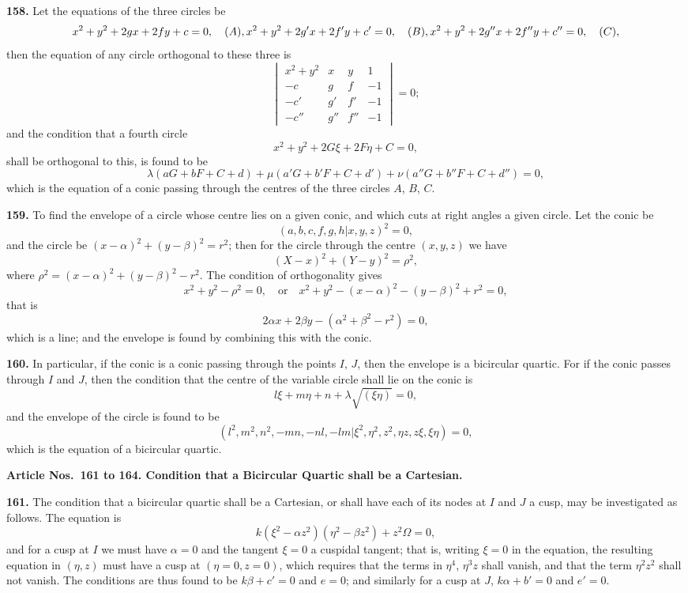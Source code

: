 \documentclass[12pt,a4paper]{article}
\theoremstyle{definition}
\begin{document}
\noindent\textbf{158.} Let the equations of the three circles be
\[
x^2 + y^2 + 2gx + 2fy + c = 0, \quad (A), \\
x^2 + y^2 + 2g'x + 2f'y + c' = 0, \quad (B), \\
x^2 + y^2 + 2g''x + 2f''y + c'' = 0, \quad (C),
\]
then the equation of any circle orthogonal to these three is
\[
\begin{vmatrix}
x^2 + y^2 & x & y & 1 \\
-c & g & f & -1 \\
-c' & g' & f' & -1 \\
-c'' & g'' & f'' & -1
\end{vmatrix}
= 0;
\]
and the condition that a fourth circle
\[
x^2 + y^2 + 2G\xi + 2F\eta + C = 0,
\]
shall be orthogonal to this, is found to be
\[
\lambda(aG + bF + C + d) + \mu(a'G + b'F + C + d') + \nu(a''G + b''F + C + d'') = 0,
\]
which is the equation of a conic passing through the centres of the three circles $A$, $B$, $C$.

\newpage
\noindent\textbf{159.} To find the envelope of a circle whose centre lies on a given conic, and
which cuts at right angles a given circle. Let the conic be
\[
(a, b, c, f, g, h \vert x, y, z)^2 = 0,
\]
and the circle be $(x - \alpha)^2 + (y - \beta)^2 = r^2$; then for the circle through the centre $(x, y, z)$
we have
\[
(X - x)^2 + (Y - y)^2 = \rho^2,
\]
where $\rho^2 = (x - \alpha)^2 + (y - \beta)^2 - r^2$. The condition of orthogonality gives
\[
x^2 + y^2 - \rho^2 = 0, \quad\text{or}\quad x^2 + y^2 - (x - \alpha)^2 - (y - \beta)^2 + r^2 = 0,
\]
that is
\[
2\alpha x + 2\beta y - (\alpha^2 + \beta^2 - r^2) = 0,
\]
which is a line; and the envelope is found by combining this with the conic.

\noindent\textbf{160.} In particular, if the conic is a conic passing through the points $I$, $J$,
then the envelope is a bicircular quartic. For if the conic passes through $I$ and $J$,
then the condition that the centre of the variable circle shall lie on the conic is
\[
l\xi + m\eta + n + \lambda\sqrt{(\xi\eta)} = 0,
\]
and the envelope of the circle is found to be
\[
(l^2, m^2, n^2, -mn, -nl, -lm\vert\xi^2, \eta^2, z^2, \eta z, z\xi, \xi\eta) = 0,
\]
which is the equation of a bicircular quartic.

\vspace{0.5em}
\noindent\textbf{Article Nos.~161 to 164. Condition that a Bicircular Quartic shall be a Cartesian.}

\vspace{0.3em}
\noindent\textbf{161.} The condition that a bicircular quartic shall be a Cartesian, or shall have
each of its nodes at $I$ and $J$ a cusp, may be investigated as follows. The equation is
\[
k(\xi^2 - \alpha z^2)(\eta^2 - \beta z^2) + z^2\Omega = 0,
\]
and for a cusp at $I$ we must have $\alpha = 0$ and the tangent $\xi = 0$ a cuspidal tangent; that
is, writing $\xi = 0$ in the equation, the resulting equation in $(\eta, z)$ must have a cusp at
$(\eta = 0, z = 0)$, which requires that the terms in $\eta^4$, $\eta^3z$ shall vanish, and that the term
$\eta^2z^2$ shall not vanish. The conditions are thus found to be $k\beta + c' = 0$ and $e = 0$;
and similarly for a cusp at $J$, $k\alpha + b' = 0$ and $e' = 0$.
\end{document}
